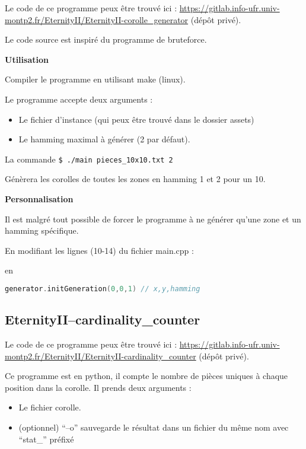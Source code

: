 	Le code de ce programme peux être trouvé ici : \url{https://gitlab.info-ufr.univ-montp2.fr/EternityII/EternityII-corolle_generator} (dépôt privé).
	
	Le code source est inspiré du programme de bruteforce.
	
	
	\textbf{Utilisation}
	
	Compiler le programme en utilisant make (linux).
	
	Le programme accepte deux arguments :
	
	\begin{itemize}
		\item Le fichier d'instance (qui peux être trouvé dans le dossier assets)
		\item Le hamming maximal à générer (2 par défaut).
	\end{itemize}
	
	\begin{exmp}
		La commande \lstinline[language=bash]|$ ./main pieces_10x10.txt 2|
		
		Génèrera les corolles de toutes les zones en hamming 1 et 2 pour un 10.
	\end{exmp}
	
	\textbf{Personnalisation}
	
	Il est malgré tout possible de forcer le programme à ne générer qu'une zone et un hamming spécifique.
	
	En modifiant les lignes (10-14) du fichier main.cpp :
	
	
	
	en 
	
	\begin{lstlisting}[language=c++]
generator.initGeneration(0,0,1) // x,y,hamming
	\end{lstlisting}
	
	\subsection{EternityII--cardinality\_counter} 
	
	Le code de ce programme peux être trouvé ici : \url{https://gitlab.info-ufr.univ-montp2.fr/EternityII/EternityII-cardinality_counter} (dépôt privé).
	
	Ce programme est en python, il compte le nombre de pièces uniques à chaque position dans la corolle. Il prends deux arguments :
	
	\begin{itemize}
		\item Le fichier corolle.
		\item (optionnel) \enquote{--o} sauvegarde le résultat dans un fichier du même nom avec \enquote{stat\_} préfixé
	\end{itemize}
	
